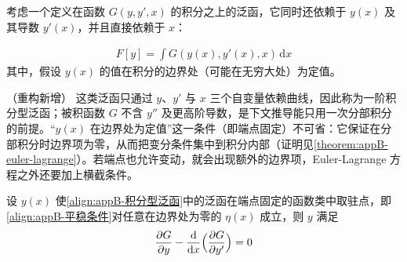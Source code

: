\documentclass[../main.tex]{subfiles}
\begin{document}
考虑一个定义在函数 $G(y,y',x)$ 的积分之上的泛函，它同时还依赖于 $y(x)$ 及其导数 $y'(x)$，并且直接依赖于 $x$：
\begin{definition}[积分型泛函]\label{definition:appB-积分型泛函}
\begin{align}
  F[y]=\int G(y(x),y'(x),x)\,\mathrm{d}x
  \label{align:appB-积分型泛函}
\end{align}
其中，假设 $y(x)$ 的值在积分的边界处（可能在无穷大处）为定值。
\end{definition}

\begin{remark}（重构新增）
这类泛函只通过 $y$、$y'$ 与 $x$ 三个自变量依赖曲线，因此称为一阶积分型泛函；被积函数 $G$ 不含 $y''$ 及更高阶导数，是下文推导能只用一次分部积分的前提。“$y(x)$ 在边界处为定值”这一条件（即端点固定）不可省：它保证在分部积分时边界项为零，从而把变分条件集中到积分内部（证明见\cref{theorem:appB-euler-lagrange}）。若端点也允许变动，就会出现额外的边界项，Euler-Lagrange 方程之外还要加上横截条件。
\end{remark}

\begin{theorem}\label{theorem:appB-euler-lagrange}
设 $y(x)$ 使\eqref{align:appB-积分型泛函}中的泛函在端点固定的函数类中取驻点，即\eqref{align:appB-平稳条件}对任意在边界处为零的 $\eta(x)$ 成立，则 $y$ 满足
\begin{align}
  \frac{\partial G}{\partial y}-\frac{\mathrm{d}}{\mathrm{d}x}\Bigl(\frac{\partial G}{\partial y'}\Bigr)=0
  \label{align:appB-euler-lagrange}
\end{align}
\end{theorem}
\end{document}
